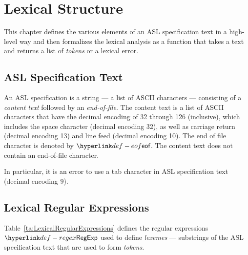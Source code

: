 \chapter{Lexical Structure\label{chap:LexicalStructure}}
This chapter defines the various elements of an ASL specification text in a high-level way
and then formalizes the lexical analysis as a function that takes a text and returns
a list of \emph{tokens} or a lexical error.

\section{ASL Specification Text}
An ASL specification is a string --- a list of ASCII characters --- consisting of a \emph{content text}
followed by an \emph{end-of-file}.
The content text is a list of
ASCII characters that have the decimal encoding of 32 through 126 (inclusive),
which includes the space character (decimal encoding 32),
as well as
carriage return (decimal encoding 13) and line feed (decimal encoding 10).
\hypertarget{def-eof}{}
The end of file character is denoted by $\eof$.
The content text does not contain an end-of-file character.

In particular, it is an error to use a tab character in ASL specification text (decimal encoding 9).

\section{Lexical Regular Expressions}

\hypertarget{def-regex}{}
Table~\ref{ta:LexicalRegularExpressions} defines the regular expressions $\RegExp$ used to define
\emph{lexemes} --- substrings of the ASL specification text that are used to form \emph{tokens}.

